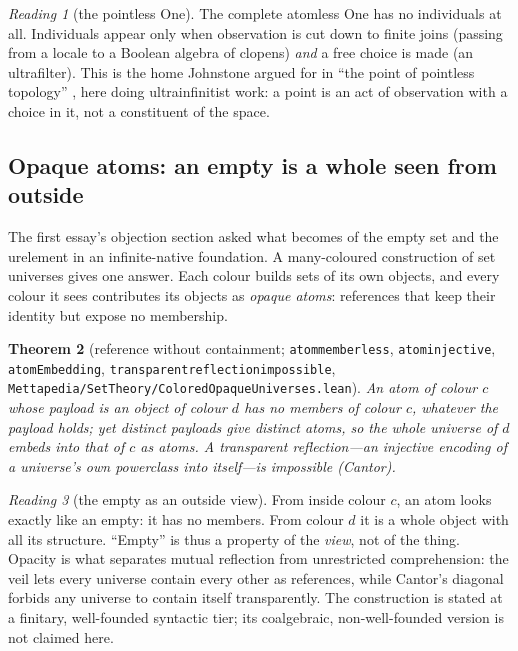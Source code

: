 \documentclass[]{article}
\newtheorem{theorem}{Theorem}
\theoremstyle{definition}
\theoremstyle{remark}
\newtheorem{reading}[theorem]{Reading}
\newcommand{\codeus}{\textunderscore\allowbreak}
\newcommand{\code}[1]{\texttt{\let\_\codeus #1}}
\newcommand{\lpath}[1]{{\ttfamily\nolinkurl{#1}}}
\begin{document}
\begin{reading}[the pointless One]
\label{read:pointless}
The complete atomless One has no individuals at all. Individuals appear only when observation is
cut down to finite joins (passing from a locale to a Boolean algebra of clopens) \emph{and} a free
choice is made (an ultrafilter). This is the home Johnstone argued for in ``the point of pointless
topology'' \cite{Johnstone1983}, here doing ultrainfinitist work: a point is an act of observation
with a choice in it, not a constituent of the space.
\end{reading}

\subsection{Opaque atoms: an empty is a whole seen from outside}
\label{sec:opaque}

The first essay's objection section asked what becomes of the empty set and the urelement in an
infinite-native foundation. A many-coloured construction of set universes gives one answer. Each
colour builds sets of its own objects, and every colour it sees contributes its objects as
\emph{opaque atoms}: references that keep their identity but expose no membership.

\begin{theorem}[reference without containment; \code{atom\_memberless}, \code{atom\_injective},
\code{atomEmbedding}, \code{transparent\_reflection\_impossible},
\lpath{Mettapedia/SetTheory/ColoredOpaqueUniverses.lean}]
\label{thm:opaque}
An atom of colour $c$ whose payload is an object of colour $d$ has no members of colour $c$,
whatever the payload holds; yet distinct payloads give distinct atoms, so the whole universe of $d$
embeds into that of $c$ as atoms. A \emph{transparent} reflection---an injective encoding of a
universe's own powerclass into itself---is impossible (Cantor).
\end{theorem}

\begin{reading}[the empty as an outside view]
\label{read:opaque}
From inside colour $c$, an atom looks exactly like an empty: it has no members. From colour $d$ it
is a whole object with all its structure. ``Empty'' is thus a property of the \emph{view}, not of
the thing. Opacity is what separates mutual reflection from unrestricted comprehension: the veil
lets every universe contain every other as references, while Cantor's diagonal forbids any
universe to contain itself transparently. The construction is stated at a finitary,
well-founded syntactic tier; its coalgebraic, non-well-founded version is not claimed here.
\end{reading}
\end{document}
